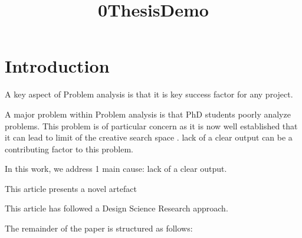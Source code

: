 \documentclass{article}
\title{0ThesisDemo}
\author{}
\begin{document}
\maketitle
      

\section{Introduction}

A key aspect of Problem analysis is that it is key success factor for any project. 
    
A major problem within Problem analysis is that PhD students poorly analyze problems. This problem is of particular concern as it is now well established that it can lead to limit of the creative search space \cite{Kokotovich2008}. lack of a clear output can be a contributing factor to this problem. 
    

    
In this work, we address 1 main cause: lack of a clear output. 
    
This article presents a novel artefact
    

    

      
This article has followed a Design Science Research approach.

The remainder of the paper is structured as follows: 

    
      


\end{document}
